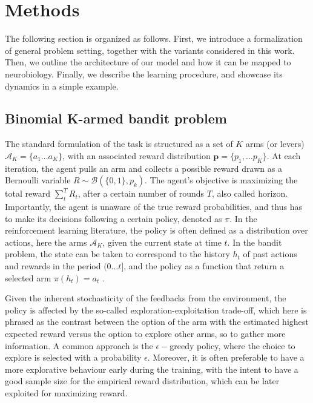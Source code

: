 

\section{Methods}

\noindent The following section is organized as follows. First, we introduce a formalization of general problem setting, together with the variants considered in this work. Then, we outline the architecture of our model and how it can be mapped to neurobiology. Finally, we describe the learning procedure,
and showcase its dynamics in a simple example.


\subsection{Binomial K-armed bandit problem}
\hfill \break
\noindent The standard formulation of the task is structured as a set of $K$ arms (or levers) $\mathcal{A}_{K}=\{a_{1}\ldots a_{K}\}$, with an associated reward distribution $\mathbf{p}=\{p_{1}, \ldots p_{K}\}$.
At each iteration, the agent pulls an arm and collects a possible reward drawn as a Bernoulli variable $R\sim \mathcal{B}(\{0,1\},p_{k})$. The agent's objective is maximizing the total reward $\sum^{T}_{t} R_{t}$, after a certain number of rounds $T$, also called horizon.
Importantly, the agent is unaware of the true reward probabilities, and thus has to make its decisions following a certain policy, denoted as $\pi$.
In the reinforcement learning literature, the policy is often defined as a distribution over actions, here the arms $\mathcal{A}_{K}$, given the current state at time $t$. In the bandit problem, the state can be taken to correspond to the history $h_{t}$ of past actions and rewards in the period
$(0\ldots t]$, and the policy as a function that return a selected arm $\pi(h_{t})=a_{t}$ \cite{qiForcedExplorationBandit2023}.

Given the inherent stochasticity of the feedbacks from the environment, the policy is affected by the so-called exploration-exploitation trade-off, which here is phrased as the contrast between the option of the arm with the estimated highest expected reward versus the option to explore other arms, so to gather more information.
A common approach is the $\epsilon-$greedy policy, where the choice to explore is selected with a probability $\epsilon$.
Moreover, it is often preferable to have a more explorative behaviour early during the training, with the intent to have a good sample size for the empirical reward distribution, which can be later exploited for maximizing reward.

